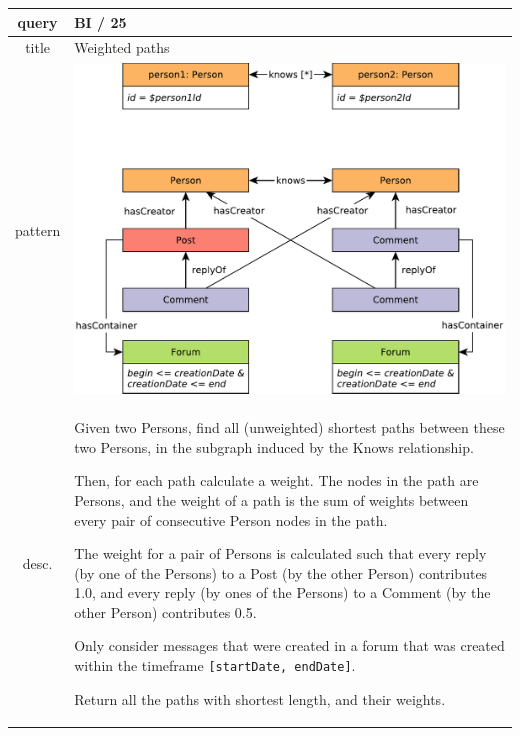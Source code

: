 \renewcommand*{\arraystretch}{1.1}

\noindent\begin{tabularx}{17cm}{|>{\small \sf}c|X|}
	\hline
	query    & BI / 25 \\ \hline
%
	title       & Weighted paths \\ \hline
%
    pattern     & \hfill\includegraphics[scale=\patternscale,margin=0cm .2cm]{patterns/bi-read-25}\hfill\vadjust{} \\ \hline
%
	desc. & Given two Persons, find all (unweighted) shortest paths between these
two Persons, in the subgraph induced by the Knows relationship.

Then, for each path calculate a weight. The nodes in the path are
Persons, and the weight of a path is the sum of weights between every
pair of consecutive Person nodes in the path.

The weight for a pair of Persons is calculated such that every reply (by
one of the Persons) to a Post (by the other Person) contributes 1.0, and
every reply (by ones of the Persons) to a Comment (by the other Person)
contributes 0.5.

Only consider messages that were created in a forum that was created
within the timeframe \texttt{{[}startDate,\ endDate{]}}.

Return all the paths with shortest length, and their weights.
 \\ \hline
%
	

\end{tabularx}

